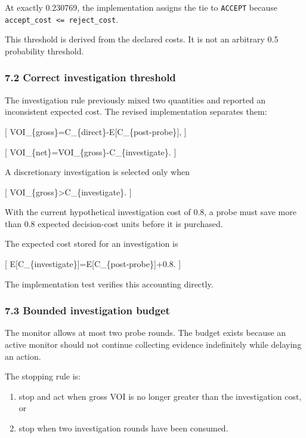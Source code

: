 \documentclass[
]{article}
\providecommand{\tightlist}{%
  \setlength{\itemsep}{0pt}\setlength{\parskip}{0pt}}
\begin{document}
At exactly 0.230769, the implementation assigns the tie to
\texttt{ACCEPT} because
\texttt{accept\_cost\ \textless{}=\ reject\_cost}.

This threshold is derived from the declared costs. It is not an
arbitrary 0.5 probability threshold.

\subsubsection{7.2 Correct investigation
threshold}\label{correct-investigation-threshold}

The investigation rule previously mixed two quantities and reported an
inconsistent expected cost. The revised implementation separates them:

{[} VOI\_\{gross\}=C\_\{direct\}-E{[}C\_\{post\mbox{-}probe\}{]}, {]}

{[} VOI\_\{net\}=VOI\_\{gross\}-C\_\{investigate\}. {]}

A discretionary investigation is selected only when

{[} VOI\_\{gross\}\textgreater C\_\{investigate\}. {]}

With the current hypothetical investigation cost of 0.8, a probe must
save more than 0.8 expected decision-cost units before it is purchased.

The expected cost stored for an investigation is

{[} E{[}C\_\{investigate\}{]}=E{[}C\_\{post\mbox{-}probe\}{]}+0.8. {]}

The implementation test verifies this accounting directly.

\subsubsection{7.3 Bounded investigation
budget}\label{bounded-investigation-budget}

The monitor allows at most two probe rounds. The budget exists because
an active monitor should not continue collecting evidence indefinitely
while delaying an action.

The stopping rule is:

\begin{enumerate}
\def\labelenumi{\arabic{enumi}.}
\tightlist
\item
  stop and act when gross VOI is no longer greater than the
  investigation cost, or
\item
  stop when two investigation rounds have been consumed.
\end{enumerate}
\end{document}
